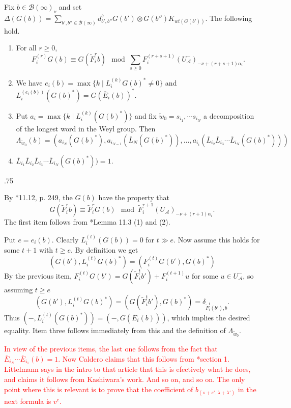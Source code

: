\documentclass[11pt,fleqn]{article}
\makeatletter
\renewenvironment{proof}[1][\textit{Proof}]{\par
  \pushQED{\qed}%
  \normalfont \topsep.75\paraskip\relax
  \trivlist
  \item[\hskip\labelsep
        \itshape
    #1\@addpunct{.}]\ignorespaces
}{%
  \popQED\endtrivlist\@endpefalse
}
\newcommand\ot{\otimes}
\newcommand\A{\mathcal A}
\newcommand\B{\mathcal B}
\makeatother
\begin{document}
\begin{Lemma*}
Fix $b \in \B(\infty)_{\nu}$ and set $\Delta(G(b)) = 
\sum_{b',b'' \in \B(\infty)} d_{b',b''}^{b} G(b') \ot G(b'')K_{wt(G(b'))}$. 
The following hold.
\begin{enumerate}

\item For all $r \geq 0$,
\[
  F_i^{(r)}G(b) 
    \equiv G(\tilde F_i^r b) \mod 
    \sum_{s \geq 0} F_i^{(r+s+1)}(U^-_\A)_{-\nu+(r+s+1)\alpha_i}.
\]

\item We have $e_i(b) = \max \{k \mid L_i^{(k)}G(b)^* \neq 0\}$ and
$L_i^{(e_i(b))}(G(b)^*) = G(\overline E_i(b))^*$.

\item Put $a_i = \max \{k \mid L_i^{(k)}(G(b)^*)\}$ and fix $\tilde w_0
=s_{i_1}, \cdots s_{i_N}$ a decomposition of the longest word in the Weyl 
group. Then
\[
  \Lambda_{\tilde w_0}(b)
    = (a_{i_N}(G(b)^*), a_{i_{N-1}}(\overline L_N(G(b)^*)), \ldots, 
    a_{i_i}(\overline L_{i_2} \overline L_{i_3} \cdots \overline L_{i_N}
    (G(b)^*)))
\]

\item $\overline L_{i_1} \overline L_{i_2} \overline L_{i_3} \cdots \overline 
L_{i_N} (G(b)^*)) = 1$.
\end{enumerate}
\end{Lemma*}
\begin{proof}
By \cite{Jan}*{11.12, p. 249}, the $G(b)$ have the property that
\[
  G(\tilde F_i^r b) \equiv \tilde F_i^r G(b) \mod 
    \tilde F_i^{r+1}(U_\A)_{-\nu + (r+1) \alpha_i}.
\]
The first item follows from \cite{Jan}*{Lemma 11.3 (1) and (2)}.

Put $e = e_i(b)$. Clearly $L_i^{(t)}(G(b)) = 0$ for $t \gg e$. Now assume this 
holds for some $t+1$ with $t \geq e$. By definition we get
\[
  (G(b'), L^{(t)}_i G(b)^*) = (F_i^{(t)}G(b'), G(b)^*)
\]
By the previous item, $F_i^{(t)}G(b') = G(\tilde F_i^t b') + F_i^{(t+1)}u$ 
for some $u \in U^-_\A$, so assuming $t \geq e$
\[
  (G(b'), L^{(t)}_i G(b)^*) = (G(\tilde F_i^t b'), G(b)^*) = 
  \delta_{\tilde F_i^t(b'), b}.
\]
Thus $(-, L_i^{(t)}(G(b)^*)) = (-,G(\overline E_i(b)))$, which implies the 
desired equality. Item three follows immediately from this and the definition
of $\Lambda_{\tilde w_0}$.

\textcolor{red}{
In view of the previous items, the last one follows from the fact that 
$\overline E_{i_N} \cdots \overline E_{i_1} (b) = 1$. Now Caldero claims that 
this follows from \cite{Lit}*{section 1}. Littelmann says in the intro to 
that article that this is efectively what he does, and claims it follows from 
Kashiwara's work. And so on, and so on. The only point where this is relevant
is to prove that the coefficient of $b_{(s+s',\lambda+\lambda')}$ in the next 
formula is $v^c$.
}
\end{proof}
\end{document}
